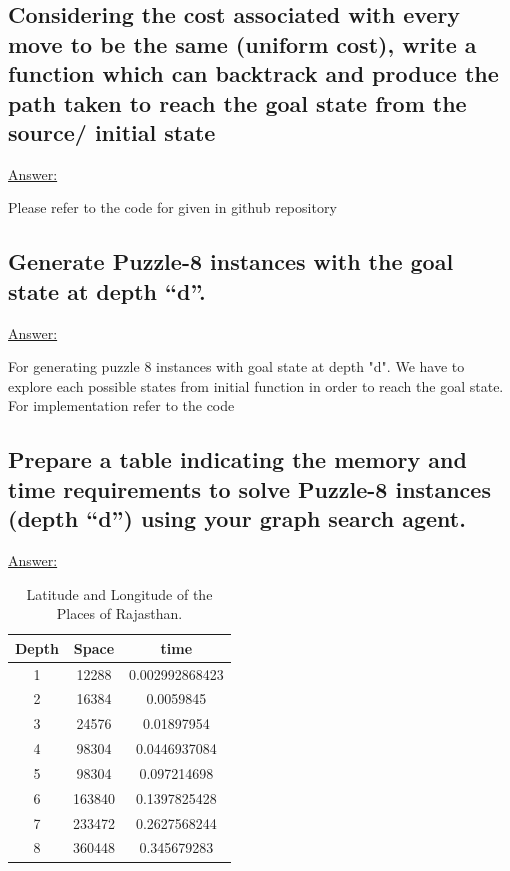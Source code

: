 \documentclass[15pt,journal]{IEEEtran}
\begin{document}
    
\subsection{Considering the cost associated with every move to be the same (uniform cost), write a function which can backtrack and produce the path taken to reach the goal state from the source/ initial state}

\underline{Answer:}

Please refer to the code for given in github repository


\subsection{Generate Puzzle-8 instances with the goal state at depth “d”.}

\underline{Answer:}

For generating puzzle 8 instances with goal state at depth "d". We have to explore each possible states from initial function in order to reach the goal state. For implementation refer to the code


\subsection{Prepare a table indicating the memory and time requirements to solve Puzzle-8 instances (depth “d”) using your graph search agent.}

\underline{Answer:}
\begin{table}[!ht] %
\centering


\begin{tabular}{| c | c | c |}
\hline
Depth  &  Space  & time \\
\hline 
1 & 12288 &  0.002992868423 \\
\hline
2 & 16384 & 0.0059845 \\
\hline
3 & 24576 &  0.01897954 \\
\hline
4 & 98304 &  0.0446937084 \\
\hline
5 & 98304 &  0.097214698 \\
\hline
6 & 163840 &  0.1397825428 \\
\hline
7 & 233472 &  0.2627568244 \\
\hline
8 & 360448 &  0.345679283 \\

\hline
\end{tabular}

\label{table:Exps}
\caption{Latitude and Longitude of the Places of Rajasthan.}
\end{table}
\end{document}
